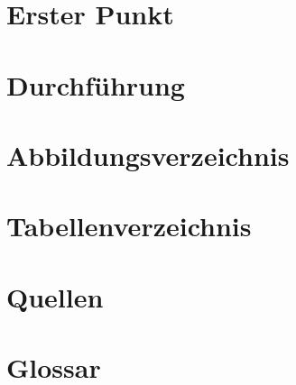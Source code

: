 \documentclass[11pt]{article}
\begin{document}
    
    \pagebreak
    \tableofcontents
    \pagebreak
    \section{Erster Punkt}
    
    \pagebreak
    \section{Durchführung}
    
    \pagebreak
    \section{Abbildungsverzeichnis}
    
    \pagebreak
    \section{Tabellenverzeichnis}
    \listoftables
    \pagebreak
    \section{Quellen}
    
    \pagebreak
    \section{Glossar}
    
\end{document}
